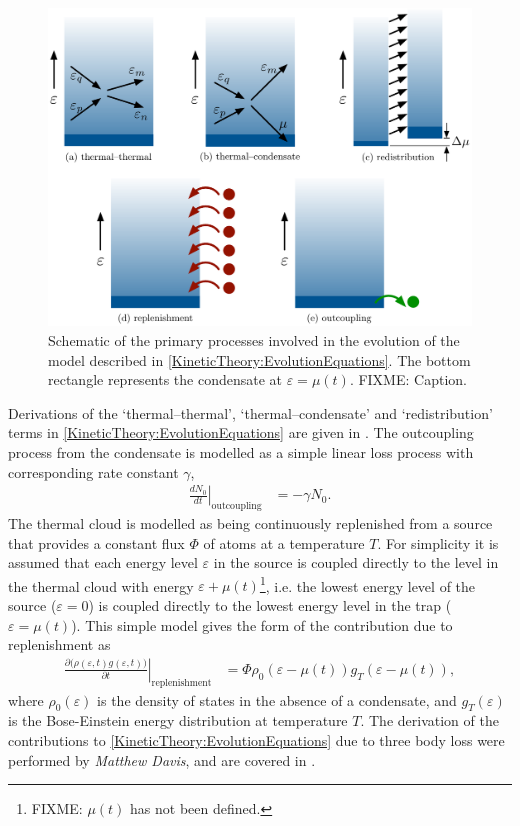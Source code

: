 \begin{figure}
    \centering
    \includegraphics[width=14cm]{ProcessDiagrams}
    \caption{Schematic of the primary processes involved in the evolution of the model described in \eqref{KineticTheory:EvolutionEquations}. The bottom rectangle represents the condensate at $\varepsilon = \mu(t)$. FIXME: Caption.}
    \label{KineticTheory:ProcessDiagrams}
\end{figure}

Derivations of the `thermal--thermal', `thermal--condensate' and `redistribution' terms in \eqref{KineticTheory:EvolutionEquations} are given in \citep{Bijlsma:2000}. The outcoupling process from the condensate is modelled as a simple linear loss process with corresponding rate constant $\gamma$,
\begin{align}
    \left.\frac{d N_0}{d t}\right|_\text{outcoupling} &= - \gamma N_0.
\end{align}
The thermal cloud is modelled as being continuously replenished from a source that provides a constant flux $\Phi$ of atoms at a temperature $T$. For simplicity it is assumed that each energy level $\varepsilon$ in the source is coupled directly to the level in the thermal cloud with energy $\varepsilon + \mu(t)$\footnote{FIXME: $\mu(t)$ has not been defined.}, i.e. the lowest energy level of the source ($\varepsilon=0$) is coupled directly to the lowest energy level in the trap ($\varepsilon = \mu(t)$). This simple model gives the form of the contribution due to replenishment as
\begin{align}
    \left. \frac{\partial \big(\rho(\varepsilon, t) g(\varepsilon, t))}{\partial t} \right|_\text{replenishment} &= \Phi \rho_0(\varepsilon - \mu(t)) g_T(\varepsilon - \mu(t)),
\end{align}
where $\rho_0(\varepsilon)$ is the density of states in the absence of a condensate, and $g_T(\varepsilon)$ is the Bose-Einstein energy distribution at temperature $T$. The derivation of the contributions to \eqref{KineticTheory:EvolutionEquations} due to three body loss were performed by \emph{Matthew Davis}, and are covered in .

